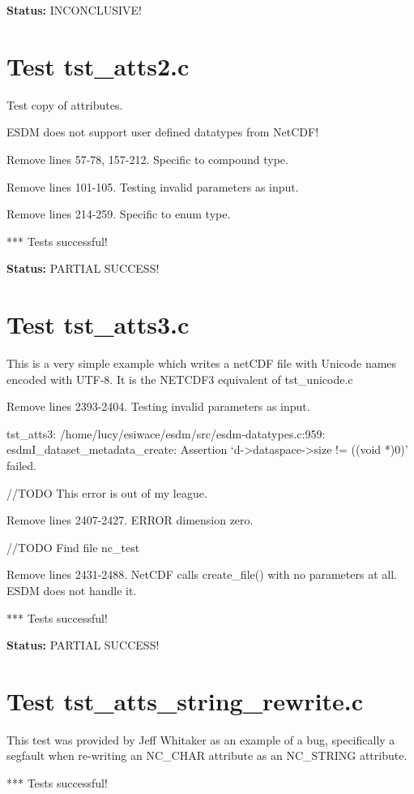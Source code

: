 {\bf \large Status: } INCONCLUSIVE!

\section{Test tst\_atts2.c}

Test copy of attributes.

ESDM does not support user defined datatypes from NetCDF!

Remove lines 57-78, 157-212. Specific to compound type.

Remove lines 101-105. Testing invalid parameters as input.

Remove lines 214-259. Specific to enum type.

*** Tests successful!

{\bf \large Status: } PARTIAL SUCCESS!

\section{Test tst\_atts3.c}

This is a very simple example which writes a netCDF file with
Unicode names encoded with UTF-8. It is the NETCDF3 equivalent
of tst\_unicode.c

Remove lines 2393-2404. Testing invalid parameters as input.

tst\_atts3: /home/lucy/esiwace/esdm/src/esdm-datatypes.c:959: esdmI\_dataset\_metadata\_create: Assertion `d->dataspace->size != ((void *)0)' failed.

//TODO This error is out of my league.

Remove lines 2407-2427. ERROR dimension zero.

//TODO Find file nc\_test

Remove lines 2431-2488. NetCDF calls create\_file() with no parameters at all. ESDM does not handle it.

*** Tests successful!

{\bf \large Status: } PARTIAL SUCCESS!

\section{Test tst\_atts\_string\_rewrite.c}

This test was provided by Jeff Whitaker as an example of a bug,
specifically a segfault when re-writing an NC\_CHAR attribute as
an NC\_STRING attribute.

*** Tests successful!

